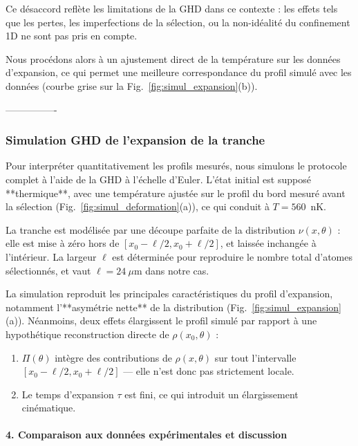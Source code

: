 Ce désaccord reflète les limitations de la GHD dans ce contexte : les effets tels que les pertes, les imperfections de la sélection, ou la non-idéalité du confinement 1D ne sont pas pris en compte.

Nous procédons alors à un ajustement direct de la température sur les données d’expansion, ce qui permet une meilleure correspondance du profil simulé avec les données (courbe grise sur la Fig.~\ref{fig:simul_expansion}(b)).

----------------

%


\subsubsection{Simulation GHD de l’expansion de la tranche}



Pour interpréter quantitativement les profils mesurés, nous simulons le protocole complet à l’aide de la GHD à l’échelle d’Euler. L’état initial est supposé **thermique**, avec une température ajustée sur le profil du bord mesuré avant la sélection (Fig.~\ref{fig:simul_deformation}(a)), ce qui conduit à $T = 560$~nK.

La tranche est modélisée par une découpe parfaite de la distribution $\nu(x,\theta)$ : elle est mise à zéro hors de $[x_0 - \ell/2, x_0 + \ell/2]$, et laissée inchangée à l’intérieur. La largeur $\ell$ est déterminée pour reproduire le nombre total d’atomes sélectionnés, et vaut $\ell = 24~\mu$m dans notre cas.

La simulation reproduit les principales caractéristiques du profil d’expansion, notamment l’**asymétrie nette** de la distribution (Fig.~\ref{fig:simul_expansion}(a)). Néanmoins, deux effets élargissent le profil simulé par rapport à une hypothétique reconstruction directe de $\rho(x_0,\theta)$ :
\begin{enumerate}
    \item $\Pi(\theta)$ intègre des contributions de $\rho(x,\theta)$ sur tout l’intervalle $[x_0 - \ell/2, x_0 + \ell/2]$ — elle n’est donc pas strictement locale.
    \item Le temps d’expansion $\tau$ est fini, ce qui introduit un élargissement cinématique.
\end{enumerate}







\paragraph{4. Comparaison aux données expérimentales et discussion}


